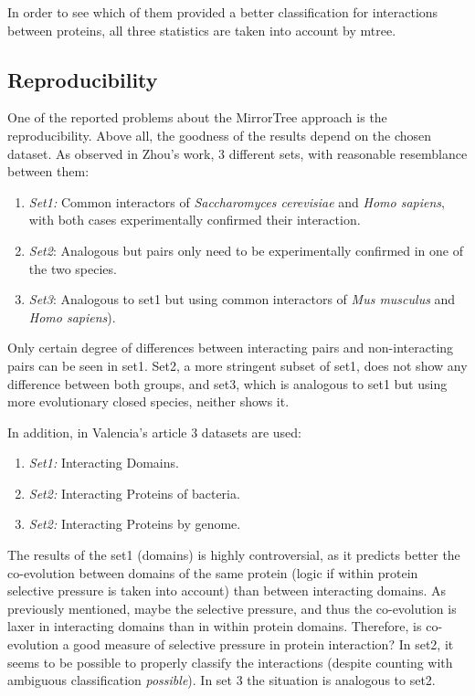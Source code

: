 \documentclass[11pt]{article}
\begin{document}
In order to see which of them provided a better classification for interactions between proteins, all three statistics are taken into account by mtree.

\subsection{Reproducibility}
One of the reported problems about the MirrorTree approach is the reproducibility. Above all, the goodness of the results depend on the chosen dataset. As observed in Zhou's work\cite{Zhou13}, 3 different sets, with reasonable resemblance between them:
\begin{enumerate}
\setlength{\itemsep}{1pt}
	\item \textit{Set1:} Common interactors of \textit{Saccharomyces cerevisiae} and \textit{Homo sapiens}, 		with both cases experimentally confirmed their interaction.
	\item \textit{Set2}: Analogous but pairs only need to be experimentally confirmed in one of the two 			species.
	\item \textit{Set3}: Analogous to set1 but using common interactors of \textit{Mus musculus} and   \textit{Homo sapiens}).
\end{enumerate}
Only certain degree of differences between interacting pairs and non-interacting pairs can be seen in set1. Set2, a more stringent subset of set1, does not show any difference between both groups, and set3, which is analogous to set1 but using more evolutionary closed species, neither shows it.

In addition, in Valencia's article\cite{Pazos2001} 3 datasets are used:
\begin{enumerate}
\setlength{\itemsep}{1pt}
	\item \textit{Set1:} Interacting Domains.
	\item \textit{Set2:} Interacting Proteins of bacteria.
	\item \textit{Set2:} Interacting Proteins by genome.
\end{enumerate}
The results of the set1 (domains) is highly controversial, as it predicts better the co-evolution between domains of the same protein (logic if within protein selective pressure is taken into account) than between interacting domains. As previously mentioned, maybe the selective pressure, and thus the co-evolution is laxer in interacting domains than in within protein domains. Therefore, is co-evolution a good measure of selective pressure in protein interaction?
In set2, it seems to be possible to properly classify the interactions (despite counting with ambiguous classification \textit{possible}). In set 3 the situation is analogous to set2.
\end{document}
